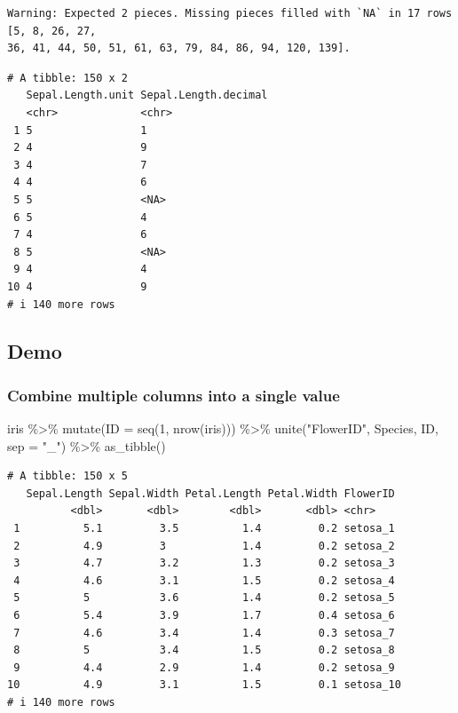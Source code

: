 \documentclass[
  letterpaper,
  DIV=11,
  numbers=noendperiod]{scrartcl}
\newenvironment{Shaded}{\begin{snugshade}}{\end{snugshade}}
\newcommand{\AttributeTok}[1]{\textcolor[rgb]{0.40,0.45,0.13}{#1}}
\newcommand{\DecValTok}[1]{\textcolor[rgb]{0.68,0.00,0.00}{#1}}
\newcommand{\FunctionTok}[1]{\textcolor[rgb]{0.28,0.35,0.67}{#1}}
\newcommand{\NormalTok}[1]{\textcolor[rgb]{0.00,0.23,0.31}{#1}}
\newcommand{\SpecialCharTok}[1]{\textcolor[rgb]{0.37,0.37,0.37}{#1}}
\newcommand{\StringTok}[1]{\textcolor[rgb]{0.13,0.47,0.30}{#1}}
\begin{document}
\begin{verbatim}
Warning: Expected 2 pieces. Missing pieces filled with `NA` in 17 rows [5, 8, 26, 27,
36, 41, 44, 50, 51, 61, 63, 79, 84, 86, 94, 120, 139].
\end{verbatim}

\begin{verbatim}
# A tibble: 150 x 2
   Sepal.Length.unit Sepal.Length.decimal
   <chr>             <chr>               
 1 5                 1                   
 2 4                 9                   
 3 4                 7                   
 4 4                 6                   
 5 5                 <NA>                
 6 5                 4                   
 7 4                 6                   
 8 5                 <NA>                
 9 4                 4                   
10 4                 9                   
# i 140 more rows
\end{verbatim}

\subsection{Demo}\label{demo-12}

\subsubsection{Combine multiple columns into a single
value}\label{combine-multiple-columns-into-a-single-value}

\begin{Shaded}
\begin{Highlighting}[]
\NormalTok{iris }\SpecialCharTok{\%\textgreater{}\%} 
  \FunctionTok{mutate}\NormalTok{(}\AttributeTok{ID =} \FunctionTok{seq}\NormalTok{(}\DecValTok{1}\NormalTok{, }\FunctionTok{nrow}\NormalTok{(iris))) }\SpecialCharTok{\%\textgreater{}\%} 
  \FunctionTok{unite}\NormalTok{(}\StringTok{"FlowerID"}\NormalTok{, Species, ID, }\AttributeTok{sep =} \StringTok{"\_"}\NormalTok{) }\SpecialCharTok{\%\textgreater{}\%} 
  \FunctionTok{as\_tibble}\NormalTok{()}
\end{Highlighting}
\end{Shaded}

\begin{verbatim}
# A tibble: 150 x 5
   Sepal.Length Sepal.Width Petal.Length Petal.Width FlowerID 
          <dbl>       <dbl>        <dbl>       <dbl> <chr>    
 1          5.1         3.5          1.4         0.2 setosa_1 
 2          4.9         3            1.4         0.2 setosa_2 
 3          4.7         3.2          1.3         0.2 setosa_3 
 4          4.6         3.1          1.5         0.2 setosa_4 
 5          5           3.6          1.4         0.2 setosa_5 
 6          5.4         3.9          1.7         0.4 setosa_6 
 7          4.6         3.4          1.4         0.3 setosa_7 
 8          5           3.4          1.5         0.2 setosa_8 
 9          4.4         2.9          1.4         0.2 setosa_9 
10          4.9         3.1          1.5         0.1 setosa_10
# i 140 more rows
\end{verbatim}
\end{document}
